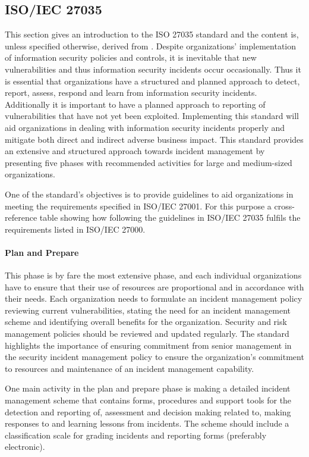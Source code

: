 \subsection{\acs{ISO}/\acs{IEC} 27035}
This section gives an introduction to the ISO 27035 standard and the content is, unless specified otherwise, derived from \cite{ISO/IEC27035}. Despite organizations' implementation of information security policies and controls, it is inevitable that new vulnerabilities and thus information security incidents occur occasionally. Thus it is essential that organizations have a structured and planned approach to detect, report, assess, respond and learn from information security incidents. Additionally it is important to have a planned approach to reporting of vulnerabilities that have not yet been exploited. Implementing this standard will aid organizations in dealing with information security incidents properly and mitigate both direct and indirect adverse business impact. This standard provides an extensive and structured approach towards incident management by presenting five phases with recommended activities for large and medium-sized organizations. 

One of the standard's objectives is to provide guidelines to aid organizations in meeting the requirements specified in ISO/IEC 27001. For this purpose a cross-reference table showing how following the guidelines in ISO/IEC 27035 fulfils the requirements listed in ISO/IEC 27000.

\paragraph{Plan and Prepare} This phase is by fare the most extensive phase, and each individual organizations have to ensure that their use of resources are proportional and in accordance with their needs. Each organization needs to formulate an incident management policy reviewing current vulnerabilities, stating the need for an incident management scheme and identifying overall benefits for the organization. Security and risk management policies should be reviewed and updated regularly. The standard highlights the importance of ensuring commitment from senior management in the security incident management policy to ensure the organization's commitment to resources and maintenance of an incident management capability.  

One main activity in the plan and prepare phase is making a detailed incident management scheme that contains forms, procedures and support tools for the detection and reporting of, assessment and decision making related to, making responses to and learning lessons from incidents. The scheme should include a classification scale for grading incidents and reporting forms (preferably electronic).   

